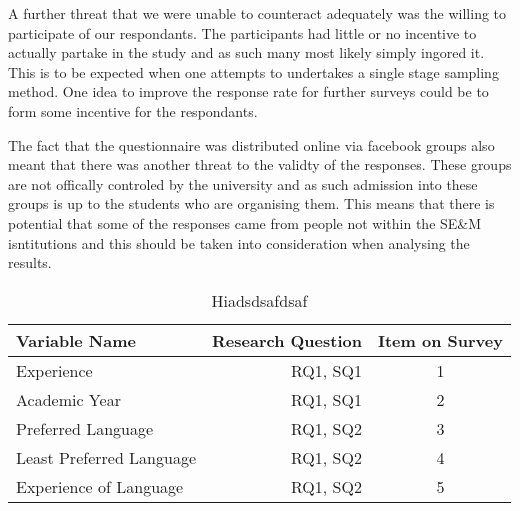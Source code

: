 \documentclass[times, 10pt,twocolumn]{IEEEtran}
\begin{document}
A further threat that we were unable to counteract adequately was the willing to participate of our respondants. The participants had little or no incentive to actually partake in the study and as such many most likely simply ingored it. This is to be expected when one attempts to undertakes a single stage sampling method. One idea to improve the response rate for further surveys could be to form some incentive for the respondants.

The fact that the questionnaire was distributed online via facebook groups also meant that there was another threat to the validty of the responses. These groups are not offically controled by the university and as such admission into these groups is up to the students who are organising them. This means that there is potential that some of the responses came from people not within the SE\&M isntitutions and this should be taken into consideration when analysing the results.




\begin{table}[ht]
  \centering
  \begin{tabular}{| l | r | c |}
  	\hline
  	\textbf{Variable Name} & \textbf{Research Question} & \textbf{Item on Survey} \\ \hline
  	Experience & RQ1, SQ1 & 1 \\ \hline
    Academic Year & RQ1, SQ1 & 2 \\ \hline
  	Preferred Language & RQ1, SQ2 & 3 \\ \hline
  	Least Preferred Language & RQ1, SQ2& 4 \\  \hline
  	Experience of Language & RQ1, SQ2 & 5 \\ 
  	\hline
	\end{tabular}
  \caption{ Hiadsdsafdsaf}
\end{table}
\end{document}
